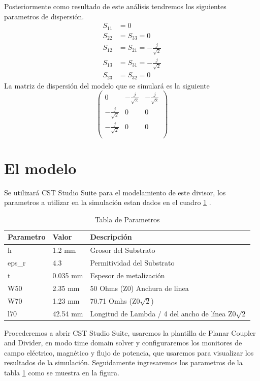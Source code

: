\documentclass[a4paper]{IEEEtran} %
\begin{document}
Posteriormente como resultado de este análisis tendremos los siguientes parametros de dispersión. 
\begin{equation}
\begin{split}
    S_{11}&=0 \\
    S_{22}&=S_{33}=0 \\
    S_{12}&=S_{21}=-\frac{j}{\sqrt{2}}\\
    S_{13}&=S_{31}=-\frac{j}{\sqrt{2}}\\
    S_{23}&=S_{32}=0
\end{split}
    \label{eq:parametros}
\end{equation}
La matriz de dispersión del modelo que se simulará es la siguiente
\begin{equation}
    \begin{pmatrix}
    0&-\frac{j}{\sqrt{2}}&-\frac{j}{\sqrt{2}}\\
    -\frac{j}{\sqrt{2}}&0&0\\
    -\frac{j}{\sqrt{2}}&0&0\\
    \end{pmatrix}
    \label{eq:matrix_numbers}
\end{equation}
\section{El modelo}
Se utilizará CST Studio Suite para el modelamiento de este divisor, los parametros a utilizar en la simulación estan dados en el cuadro \ref{tab:parametros_simulacion} \cite{cstpage}.
\begin{table}[h]
    \caption{Tabla de Parametros}
\begin{tabular}{@{}lll@{}}
\toprule
Parametro & Valor    & Descripción \\ \midrule
h         & 1.2 mm   & Grosor del Substrato \\
eps\_r    & 4.3      & Permitividad del Substrato \\
t         & 0.035 mm & Espesor de metalización \\ 
W50       & 2.35 mm  & 50 Ohms (Z0) Anchura de linea \\
W70       & 1.23 mm  & 70.71 Omhs (Z0$\sqrt{2}$) \\
l70       & 42.54 mm & Longitud de Lambda / 4 del ancho de línea Z0$\sqrt{2}$\\ \bottomrule
\end{tabular}
\label{tab:parametros_simulacion}
\end{table}

Procederemos a abrir CST Studio Suite, usaremos la plantilla de Planar Coupler and Divider, en modo time domain solver y configuraremos los monitores de campo eléctrico, magnético y flujo de potencia, que usaremos para visualizar los resultados de la simulación.
Seguidamente ingresaremos los parametros de la tabla \ref{tab:parametros_simulacion} como se muestra en la figura.
\end{document}
